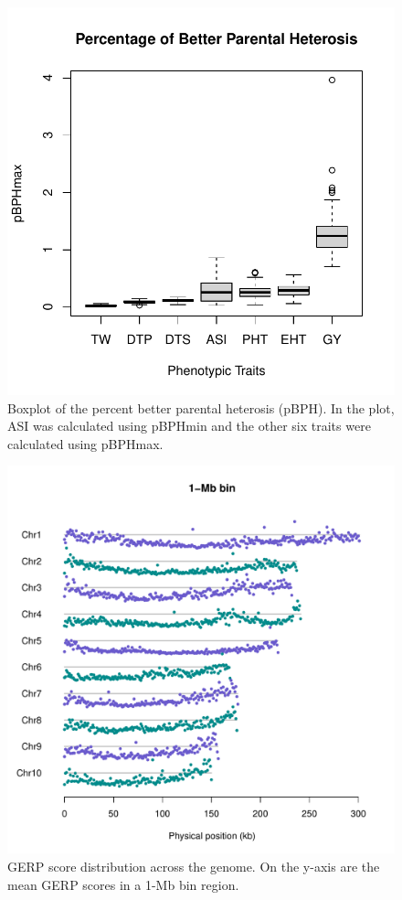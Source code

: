 \documentclass[9pt,twocolumn,twoside]{gsajnl}
\begin{document}
\begin{figure}[htbp]
\centering
\includegraphics[width=\linewidth]{SFig_pBPH.pdf}
\caption{Boxplot of the percent better parental heterosis (pBPH). In the plot, ASI was calculated using pBPHmin and the other six traits were calculated using pBPHmax.}
\label{fig:pBPH}
\end{figure}

\begin{figure}[htbp]
\centering
\includegraphics[width=\linewidth]{SFig_gerp_dis1m.pdf}
\caption{GERP score distribution across the genome. On the y-axis are the mean GERP scores in a 1-Mb bin region.}
\label{fig:dis1m}
\end{figure}
\end{document}
